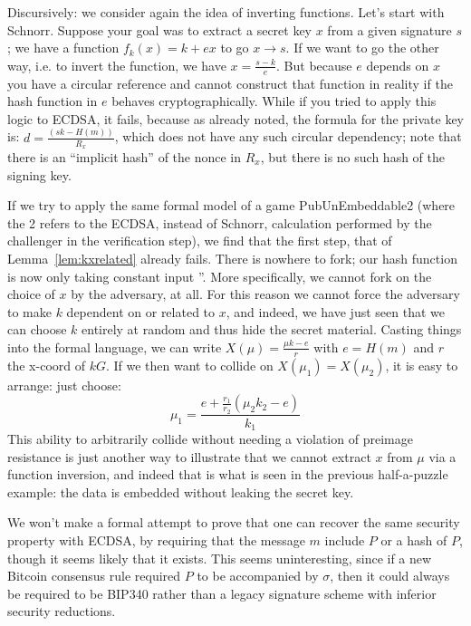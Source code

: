 \documentclass[10pt,a4paper]{article}
\theoremstyle{definition}   %
\theoremstyle{remark}       %
\begin{document}
\vskip 0.2in

Discursively: we consider again the idea of inverting functions. Let's start with Schnorr. Suppose your goal was to extract a secret key $x$ from a given signature $s$; we have a function $f_k(x) = k + ex$ to go $x \rightarrow s$. If we want to go the other way, i.e. to invert the function, we have $x = \frac{s - k}{e}$. But because $e$ depends on $x$ you have a circular reference and cannot construct that function in reality if the hash function in $e$ behaves cryptographically. While if you tried to apply this logic to ECDSA, it fails, because as already noted, the formula for the private key is: $d = \frac{(sk - H(m))}{R_x}$, which does not have any such circular dependency; note that there is an ``implicit hash'' of the nonce in $R_x$, but there is no such hash of the signing key.

\vskip 0.2in
If we try to apply the same formal model of a game PubUnEmbeddable2 (where the 2 refers to the ECDSA, instead of Schnorr, calculation performed by the challenger in the verification step), we find that the first step, that of Lemma~\ref{lem:kxrelated} already fails. There is nowhere to fork; our hash function is now only taking constant input ''. More specifically, we cannot fork on the choice of $x$ by the adversary, at all. For this reason we cannot force the adversary to make $k$ dependent on or related to $x$, and indeed, we have just seen that we can choose $k$ entirely at random and thus hide the secret material. Casting things into the formal language, we can write $X(\mu) = \frac{\mu k - e}{r}$ with $e=H(m)$ and $r$ the x-coord of $kG$. If we then want to collide on $X(\mu_1) = X(\mu_2)$, it is easy to arrange: just choose:
\[ \mu_1 = \frac{e + \frac{r_1}{r_2}\left(\mu_2 k_2 -e\right)}{k_1}
\]
This ability to arbitrarily collide without needing a violation of preimage resistance is just another way to illustrate that we cannot extract $x$ from $\mu$ via a function inversion, and indeed that is what is seen in the previous half-a-puzzle example: the data is embedded without leaking the secret key.
 
\vskip 0.2in

We won't make a formal attempt to prove that one can recover the same security property with ECDSA, by requiring that the message $m$ include $P$ or a hash of $P$, though it seems likely that it exists. This seems uninteresting, since if a new Bitcoin consensus rule required $P$ to be accompanied by $\sigma$, then it could always be required to be BIP340 rather than a legacy signature scheme with inferior security reductions.
\end{document}
